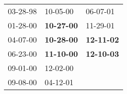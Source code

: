 \begin{supertabular}{p{0.33\columnwidth}p{0.33\columnwidth}p{0.33\columnwidth}}
 03-28-98\textsuperscript{} &           10-05-00\textsuperscript{} &           06-07-01\textsuperscript{} \\
 01-28-00\textsuperscript{} &  \textbf{10-27-00\textsuperscript{}} &           11-29-01\textsuperscript{} \\
 04-07-00\textsuperscript{} &  \textbf{10-28-00\textsuperscript{}} &  \textbf{12-11-02\textsuperscript{}} \\
 06-23-00\textsuperscript{} &  \textbf{11-10-00\textsuperscript{}} &  \textbf{12-10-03\textsuperscript{}} \\
 09-01-00\textsuperscript{} &           12-02-00\textsuperscript{} &                                      \\
 09-08-00\textsuperscript{} &           04-12-01\textsuperscript{} &                                      \\
\end{supertabular}
